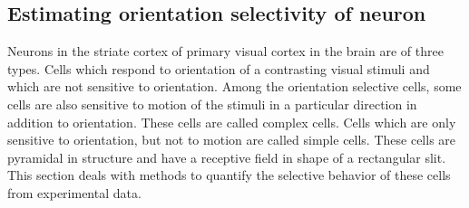 \documentclass[11pt]{article}
\begin{document}
\subsection{Estimating orientation selectivity of neuron} %
\label{sub:estimating_orientation_selectivity_of_neuron}
Neurons in the striate cortex of primary visual cortex in the brain are of three types. Cells which respond to orientation of a contrasting visual stimuli and which are not sensitive to orientation. Among the orientation selective cells, some cells are also sensitive to motion of the stimuli in a particular direction in addition to orientation. These cells are called complex cells. Cells which are only sensitive  to orientation, but not to motion are called simple cells. These cells are pyramidal in structure and have a receptive field in shape of a rectangular slit. This section deals with methods to quantify the selective behavior of these cells from experimental data.
\end{document}
